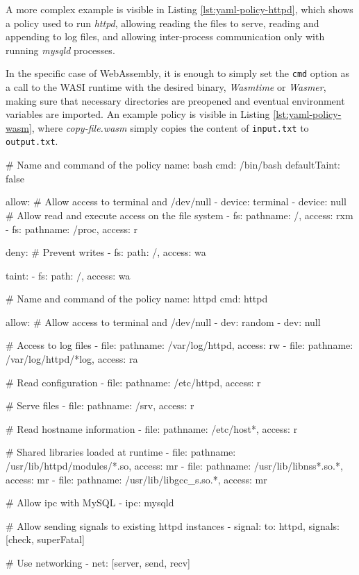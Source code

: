 A more complex example is visible in Listing \ref{lst:yaml-policy-httpd}, which shows a policy
used to run \textit{httpd}, allowing reading the files to serve, reading and appending to log files,
and allowing inter-process communication only with running \textit{mysqld} processes.

In the specific case of WebAssembly, it is enough to simply set the \texttt{cmd} option as
a call to the WASI runtime with the desired binary, \textit{Wasmtime} or \textit{Wasmer}, making sure that
necessary directories are preopened and eventual environment variables are imported.
An example policy is visible in Listing \ref{lst:yaml-policy-wasm}, where \textit{copy-file.wasm} simply copies
the content of \texttt{input.txt} to \texttt{output.txt}.

\begin{code}[caption=A policy for running bash, label=lst:yaml-policy-bash]
# Name and command of the policy
name: bash
cmd: /bin/bash
defaultTaint: false

allow:
  # Allow access to terminal and /dev/null
  - device: terminal
  - device: null
  # Allow read and execute access on the file system
  - fs: {pathname: /, access: rxm}
  - fs: {pathname: /proc, access: r}

deny:
  # Prevent writes
  - fs: {path: /, access: wa}

taint:
  - fs: {path: /, access: wa}
\end{code}

\begin{code}[caption=A policy for HTTPD, label=lst:yaml-policy-httpd]
# Name and command of the policy
name: httpd
cmd: httpd

allow:
  # Allow access to terminal and /dev/null
  - dev: random
  - dev: null

  # Access to log files
  - file: {pathname: /var/log/httpd, access: rw}
  - file: {pathname: /var/log/httpd/*log, access: ra}

  # Read configuration
  - file: {pathname: /etc/httpd, access: r}

  # Serve files
  - file: {pathname: /srv, access: r}

  # Read hostname information
  - file: {pathname: /etc/host*, access: r}

  # Shared libraries loaded at runtime
  - file: {pathname: /usr/lib/httpd/modules/*.so,
           access: mr}
  - file: {pathname: /usr/lib/libnss*.so.*, access: mr}
  - file: {pathname: /usr/lib/libgcc_s.so.*, access: mr}

  # Allow ipc with MySQL
  - ipc: mysqld

 # Allow sending signals to existing httpd instances
  - signal: {to: httpd, signals: [check, superFatal]}

  # Use networking
  - net: [server, send, recv]
\end{code}

